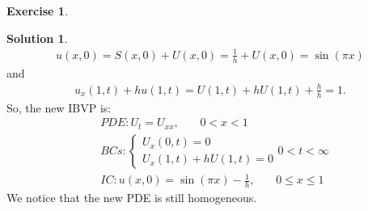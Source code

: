 \documentclass{book}
\theoremstyle{definition}
\newtheorem*{exer*}{Exercise}
\newtheorem*{sln*}{Solution}
\begin{document}
\begin{exer*}
\begin{sln*}
		\begin{align*}
		u(x,0) = S(x,0) + U(x,0) = \frac{1}{h} + U(x,0) = \sin(\pi x)
		\end{align*}
		and
		\begin{align*}
		u_x(1,t) + hu(1,t) = U(1,t) + hU(1,t) + \frac{h}{h} = 1.
		\end{align*}
		So, the new IBVP is:
		\begin{align*}
		&PDE: U_t = U_{xx},\,\,\,\,\,\,\,\,\,\,\, 0<x<1\\
		&BCs:  
		\begin{cases}
		U_x(0,t) = 0\\
		U_x(1,t) + hU(1,t)= 0
		\end{cases} 0 < t < \infty\\
		&IC: u(x,0) = \sin(\pi x)-\frac{1}{h}   ,\,\,\,\,\,\,\,\,\,\,\, 0 \leq x\leq 1
		\end{align*}
		We notice that the new PDE is still homogeneous. 
	\end{sln*}
\end{exer*}
\newpage
\end{document}
